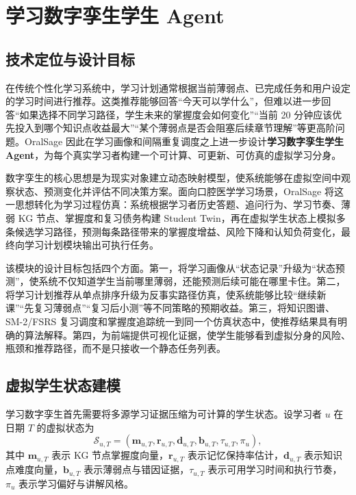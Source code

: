 
\chapter{学习数字孪生学生 Agent}
\label{sec:student-twin-simulation}

\section{技术定位与设计目标}

在传统个性化学习系统中，学习计划通常根据当前薄弱点、已完成任务和用户设定的学习时间进行推荐。这类推荐能够回答“今天可以学什么”，但难以进一步回答“如果选择不同学习路径，学生未来的掌握度会如何变化”“当前 20 分钟应该优先投入到哪个知识点收益最大”“某个薄弱点是否会阻塞后续章节理解”等更高阶问题。OralSage 因此在学习画像和间隔重复调度之上进一步设计\textbf{学习数字孪生学生 Agent}，为每个真实学习者构建一个可计算、可更新、可仿真的虚拟学习分身。

数字孪生的核心思想是为现实对象建立动态映射模型，使系统能够在虚拟空间中观察状态、预测变化并评估不同决策方案\cite{grieves2017digitaltwin}。面向口腔医学学习场景，OralSage 将这一思想转化为学习过程仿真：系统根据学习者历史答题、追问行为、学习节奏、薄弱 KG 节点、掌握度和复习债务构建 Student Twin，再在虚拟学生状态上模拟多条候选学习路径，预测每条路径带来的掌握度增益、风险下降和认知负荷变化，最终向学习计划模块输出可执行任务。

该模块的设计目标包括四个方面。第一，将学习画像从“状态记录”升级为“状态预测”，使系统不仅知道学生当前哪里薄弱，还能预测后续可能在哪里卡住。第二，将学习计划推荐从单点排序升级为反事实路径仿真，使系统能够比较“继续新课”“先复习薄弱点”“复习后小测”等不同策略的预期收益。第三，将知识图谱、SM-2/FSRS 复习调度和掌握度追踪统一到同一个仿真状态中，使推荐结果具有明确的算法解释。第四，为前端提供可视化证据，使学生能够看到虚拟分身的风险、瓶颈和推荐路径，而不是只接收一个静态任务列表。

\section{虚拟学生状态建模}

学习数字孪生首先需要将多源学习证据压缩为可计算的学生状态。设学习者 $u$ 在日期 $T$ 的虚拟状态为
\begin{equation}
  \mathcal{S}_{u,T}=
  \left(
  \mathbf{m}_{u,T},
  \mathbf{r}_{u,T},
  \mathbf{d}_{u,T},
  \mathbf{b}_{u,T},
  \tau_{u,T},
  \pi_u
  \right),
  \label{eq:student-twin-state}
\end{equation}
其中 $\mathbf{m}_{u,T}$ 表示 KG 节点掌握度向量，$\mathbf{r}_{u,T}$ 表示记忆保持率估计，$\mathbf{d}_{u,T}$ 表示知识点难度向量，$\mathbf{b}_{u,T}$ 表示薄弱点与错因证据，$\tau_{u,T}$ 表示可用学习时间和执行节奏，$\pi_u$ 表示学习偏好与讲解风格。

